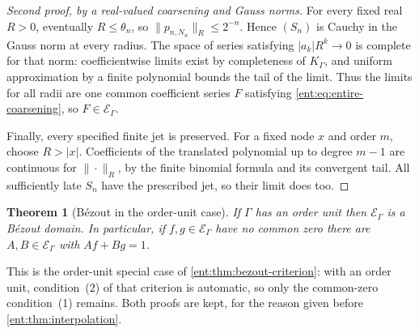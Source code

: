 \documentclass[11pt]{article}
\newtheorem{theorem}{Theorem}[section]
\theoremstyle{plain}
\theoremstyle{plain}
\theoremstyle{plain}
\theoremstyle{definition}
\theoremstyle{definition}
\theoremstyle{definition}
\theoremstyle{definition}
\theoremstyle{remark}
\newcommand{\K}{K_\Gamma}\newcommand{\KD}{K_\Delta}
\newcommand{\E}{\mathcal E_\Gamma}
\begin{document}
\begin{proof}[Second proof, by a real-valued coarsening and Gauss norms]
For every fixed real $R>0$, eventually $R\le\theta_n$, so
$\|p_{n,N_n}\|_R\le2^{-n}$. Hence $(S_n)$ is Cauchy in the Gauss norm at
every radius. The space of series satisfying $|a_k|R^k\to0$ is complete for
that norm: coefficientwise limits exist by completeness of $\K$, and uniform
approximation by a finite polynomial bounds the tail of the limit. Thus the
limits for all radii are one common coefficient series $F$ satisfying
\eqref{ent:eq:entire-coarsening}, so $F\in\E$.

Finally, every specified finite jet is preserved. For a fixed node $x$ and
order $m$, choose $R>|x|$. Coefficients of the translated polynomial up to
degree $m-1$ are continuous for $\|\cdot\|_R$, by the finite binomial formula
and its convergent tail. All sufficiently late $S_n$ have the prescribed jet,
so their limit does too.
\end{proof}

\begin{theorem}[B\'ezout in the order-unit case]\label{ent:thm:bezout}
If $\Gamma$ has an order unit then $\E$ is a B\'ezout domain. In particular,
if $f,g\in\E$ have no common zero there are $A,B\in\E$ with $Af+Bg=1$.
\end{theorem}

This is the order-unit special case of \cref{ent:thm:bezout-criterion}: with
an order unit, condition~(2) of that criterion is automatic, so only the
common-zero condition~(1) remains. Both proofs are kept, for the reason given
before \cref{ent:thm:interpolation}.
\end{document}
